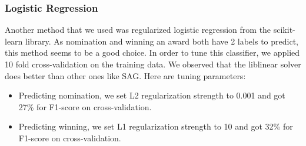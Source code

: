\documentclass[journal,transmag]{IEEEtran}
\begin{document}
			\subsubsection{Logistic Regression}
			Another method that we used was regularized logistic regression from the scikit-learn library. As nomination and winning an award both have 2 labels to predict, this method seems to be a good choice. In order to tune this classifier, we applied 10 fold cross-validation on the training data. We observed that the liblinear solver does better than other ones like SAG. Here are tuning parameters:
			\begin{itemize}
				\item Predicting nomination, we set L2 regularization strength to 0.001 and got 27\% for F1-score on cross-validation.
				\item Predicting winning, we set L1 regularization strength to 10 and got 32\% for F1-score on cross-validation.
			\end{itemize}
			
			
\end{document}
